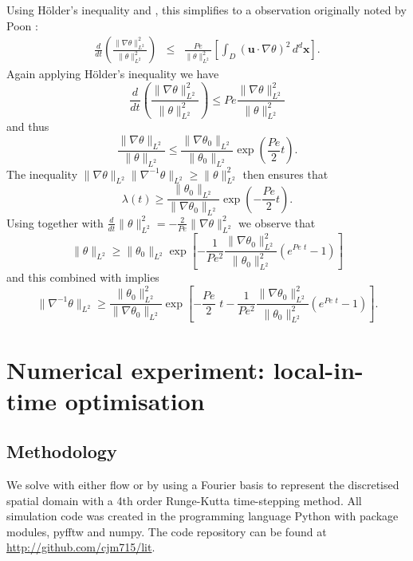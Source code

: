 \documentclass[12pt]{iopart}
\newcommand{\ddt}[1]{\frac{d #1}{dt}}
\newcommand{\hmone}[1]{\|\nabla^{-1} #1\|_{L^{2}}}
\newcommand{\ltwo}[1]{\|#1\|_{L^{2}}}
\newcommand{\hone}[1]{\| \nabla #1\|_{L^{2}}}
\newcommand{\sint}[1]{\int_{D} #1 \, d^{d}\mathbf{x}}
\renewcommand{\vec}[1]{\mathbf{#1}}
\newcommand{\pbrac}[1]{\left( #1 \right)}
\newcommand{\sbrac}[1]{\left[ #1 \right]}
\begin{document}
%
Using H\"older's inequality and , this simplifies to a observation originally noted by Poon \cite{Chi-Cheu1996}:
%
\begin{eqnarray}
	\ddt{} \pbrac{ \frac{\hone{\theta}^2}{\ltwo{\theta}^2} } 
			&\leq & \frac{Pe}{\ltwo{\theta}^2}
			\sbrac{
					 \sint{(\vec{u}\cdot \nabla \theta)^2} 
			}.
\end{eqnarray}
Again applying H\"older's inequality we have
\begin{equation}
\label{eq:k2growth_energy}
	\ddt{} 
		\pbrac{ 
			\frac{\hone{\theta}^2}{\ltwo{\theta}^2} 
		} 
		\leq  
		Pe
		\frac{\hone{\theta}^2}{\ltwo{\theta}^2} 
\end{equation}
%
and thus 
%
\begin{equation*}
		\frac{\hone{\theta}}{\ltwo{\theta}} 
		\leq  
		\frac{\hone{\theta_0}}{\ltwo{\theta_0}}
		\exp{\pbrac{\frac{Pe}{2} t}}.
\end{equation*}
%
The inequality $\hone{\theta}\hmone{\theta}\geq \ltwo{\theta}^2$ then ensures that
%
\begin{equation}
\label{eq:lambda_bound}
\lambda(t) \geq \frac{\ltwo{\theta_0}}{\hone{\theta_0}}\exp{\pbrac{-\frac{Pe}{2}t}}.
\end{equation}
%
Using  together with  $\ddt{}\ltwo{\theta}^2 = -\frac{2}{Pe} \hone{\theta}^2$ we observe that
%
\begin{equation*}
\ltwo{\theta}\geq \ltwo{\theta_{0}}\exp\left[-\frac{1}{Pe^2}\frac{\hone{\theta_0}^2}{\ltwo{\theta_0}^2}\left(e^{Pe \, \, t}-1\right)\right]
\end{equation*}
%
and this combined with   implies
%
\begin{equation}
\hmone{\theta}\geq \frac{\ltwo{\theta_{0}}^2}{\hone{\theta_0}}\exp\left[-\frac{Pe}{2} \,\, t-\frac{1}{Pe^2}\frac{\hone{\theta_0}^2}{\ltwo{\theta_0}^2}\left(e^{Pe \,\, t}-1\right)\right].
\end{equation}


\section{Numerical experiment: local-in-time optimisation}
\label{sec:numerical_experiment}
\subsection{Methodology}


We solve  with either flow  or  by using a Fourier basis to represent the discretised spatial domain with a 4th order Runge-Kutta time-stepping method. All simulation code was created in the programming language Python with package modules, pyfftw and numpy. The code repository can be found at \href{http://github.com/cjm715/lit}{ http://github.com/cjm715/lit}.
\end{document}
